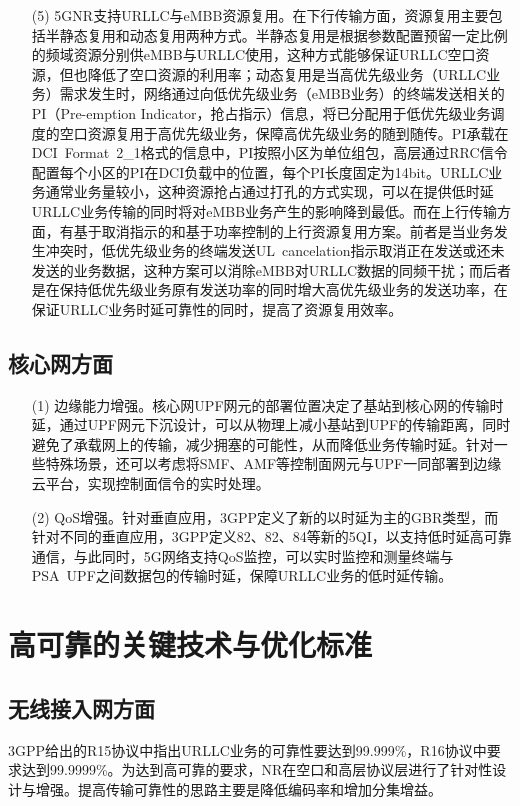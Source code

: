 \documentclass[12pt,a4paper,oneside]{article}
\begin{document}
\begin{enumerate}
    \item[(5)] 5GNR支持URLLC与eMBB资源复用。在下行传输方面，资源复用主要包括半静态复用和动态复用两种方式。半静态复用是根据参数配置预留一定比例的频域资源分别供eMBB与URLLC使用，这种方式能够保证URLLC空口资源，但也降低了空口资源的利用率；动态复用是当高优先级业务（URLLC业务）需求发生时，网络通过向低优先级业务（eMBB业务）的终端发送相关的PI（Pre-emption Indicator，抢占指示）信息，将已分配用于低优先级业务调度的空口资源复用于高优先级业务，保障高优先级业务的随到随传。PI承载在DCI\ Format\ 2\_1格式的信息中，PI按照小区为单位组包，高层通过RRC信令配置每个小区的PI在DCI负载中的位置，每个PI长度固定为14bit。URLLC业务通常业务量较小，这种资源抢占通过打孔的方式实现，可以在提供低时延URLLC业务传输的同时将对eMBB业务产生的影响降到最低。而在上行传输方面，有基于取消指示的和基于功率控制的上行资源复用方案。前者是当业务发生冲突时，低优先级业务的终端发送UL\ cancelation指示取消正在发送或还未发送的业务数据，这种方案可以消除eMBB对URLLC数据的同频干扰；而后者是在保持低优先级业务原有发送功率的同时增大高优先级业务的发送功率，在保证URLLC业务时延可靠性的同时，提高了资源复用效率。
\end{enumerate}

\subsection{核心网方面}

\begin{enumerate}
    \item[(1)] 边缘能力增强。核心网UPF网元的部署位置决定了基站到核心网的传输时延，通过UPF网元下沉设计，可以从物理上减小基站到UPF的传输距离，同时避免了承载网上的传输，减少拥塞的可能性，从而降低业务传输时延。针对一些特殊场景，还可以考虑将SMF、AMF等控制面网元与UPF一同部署到边缘云平台，实现控制面信令的实时处理。
    \item[(2)] QoS增强。针对垂直应用，3GPP定义了新的以时延为主的GBR类型，而针对不同的垂直应用，3GPP定义82、82、84等新的5QI，以支持低时延高可靠通信，与此同时，5G网络支持QoS监控，可以实时监控和测量终端与PSA\ UPF之间数据包的传输时延，保障URLLC业务的低时延传输。
\end{enumerate}

\section{高可靠的关键技术与优化标准}

\subsection{无线接入网方面}
3GPP给出的R15协议中指出URLLC业务的可靠性要达到99.999\%，R16协议中要求达到99.9999\%。为达到高可靠的要求，NR在空口和高层协议层进行了针对性设计与增强。提高传输可靠性的思路主要是降低编码率和增加分集增益。
\end{document}
